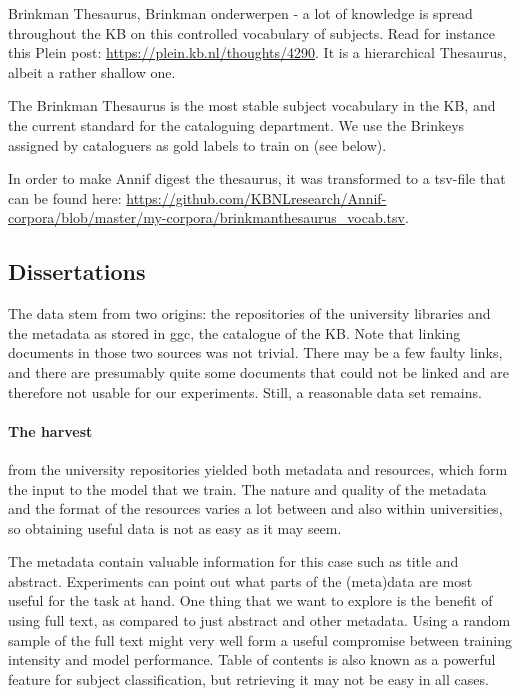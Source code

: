 \documentclass{article}
\begin{document}
Brinkman Thesaurus, Brinkman onderwerpen - a lot of knowledge is spread throughout the KB on this controlled vocabulary of subjects. Read for instance this Plein post: \url{https://plein.kb.nl/thoughts/4290}.
It is a hierarchical Thesaurus, albeit a rather shallow one. 

The Brinkman Thesaurus is the most stable subject vocabulary in the KB, and the current standard for the cataloguing department. We use the Brinkeys assigned by cataloguers as gold labels to train on (see below). 

In order to make Annif digest the thesaurus, it was transformed to a tsv-file that can be found here: \url{https://github.com/KBNLresearch/Annif-corpora/blob/master/my-corpora/brinkmanthesaurus_vocab.tsv}. 


\subsection{Dissertations}

The data stem from two origins: the repositories of the university libraries and the metadata as stored in ggc, the catalogue of the KB. Note that linking documents in those two sources was not trivial. There may be a few faulty links, and there are presumably quite some documents that could not be linked and are therefore not usable for our experiments. Still, a reasonable data set remains.

\paragraph{The harvest} from the university repositories yielded both metadata and resources, which form the input to the model that we train. The nature and quality of the metadata and the format of the resources varies a lot between and also within universities, so obtaining useful data is not as easy as it may seem. 

The metadata contain valuable information for this case such as title and abstract. Experiments can point out what parts of the (meta)data are most useful for the task at hand. One thing that we want to explore is the benefit of using full text, as compared to just abstract and other metadata. Using a random sample of the full text might very well form a useful compromise between training intensity and model performance. Table of contents is also known as a powerful feature for subject classification, but retrieving it may not be easy in all cases. 
\end{document}
